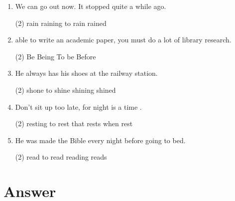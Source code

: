 \begin{enumerate}
\item We can go out now. It stopped \ttu quite a while ago.
  \begin{tasks}(2)
    \task rain
    \task raining
    \task to rain
    \task rained
  \end{tasks}

\item \ttu able to write an academic paper, you must do a lot of library research.
  \begin{tasks}(2)
    \task Be
    \task Being
    \task To be
    \task Before
  \end{tasks}

\item He always has his shoes \ttu at the railway station.
  \begin{tasks}(2)
    \task shone
    \task to shine
    \task shining
    \task shined
  \end{tasks}

\item Don't sit up too late, for night is a time \ttu.
  \begin{tasks}(2)
    \task resting
    \task to rest
    \task that rests
    \task when rest
  \end{tasks}

\item He was made \ttu the Bible every night before going to bed.
  \begin{tasks}(2)
    \task read
    \task to read
    \task reading
    \task reads
  \end{tasks}

\end{enumerate}

\section{Answer}

